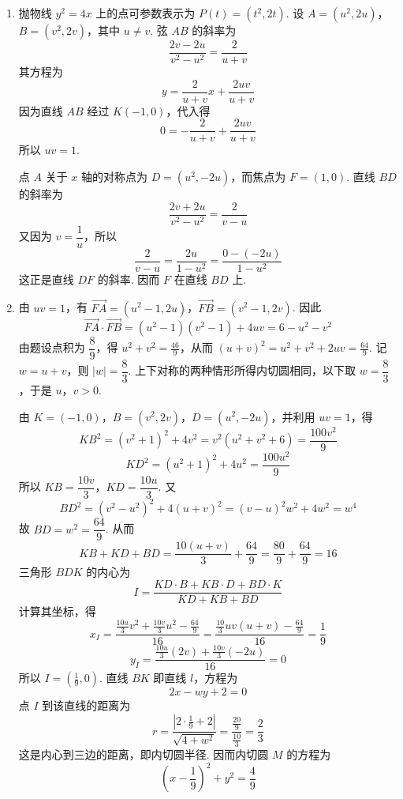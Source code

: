 \begin{solution}
\begin{enumerate}
\item 抛物线 \(y^2=4x\) 上的点可参数表示为 \(P(t)=(t^2,2t)\). 设
\(A=(u^2,2u)\)，\(B=(v^2,2v)\)，其中 \(u\ne v\). 弦 \(AB\) 的斜率为
\[
\frac{2v-2u}{v^2-u^2}=\frac{2}{u+v}
\]
其方程为
\[
y=\frac{2}{u+v}x+\frac{2uv}{u+v}
\]
因为直线 \(AB\) 经过 \(K(-1,0)\)，代入得
\[
0=-\frac{2}{u+v}+\frac{2uv}{u+v}
\]
所以 \(uv=1\).

点 \(A\) 关于 \(x\) 轴的对称点为 \(D=(u^2,-2u)\)，而焦点为 \(F=(1,0)\). 直线 \(BD\) 的斜率为
\[
\frac{2v+2u}{v^2-u^2}=\frac{2}{v-u}
\]
又因为 \(v=\dfrac1u\)，所以
\[
\frac{2}{v-u}=\frac{2u}{1-u^2}
=\frac{0-(-2u)}{1-u^2}
\]
这正是直线 \(DF\) 的斜率. 因而 \(F\) 在直线 \(BD\) 上.
\item 由 \(uv=1\)，有
\(\overrightarrow{FA}=(u^2-1,2u)\)，\(\overrightarrow{FB}=(v^2-1,2v)\).
因此
\[
\overrightarrow{FA}\cdot\overrightarrow{FB}
=(u^2-1)(v^2-1)+4uv
=6-u^2-v^2
\]
由题设点积为 \(\dfrac89\)，得 \(u^2+v^2=\frac{46}{9}\)，从而 \((u+v)^2=u^2+v^2+2uv=\frac{64}{9}\).
记 \(w=u+v\)，则 \(|w|=\dfrac83\). 上下对称的两种情形所得内切圆相同，以下取 \(w=\dfrac83\)，于是 \(u\)，\(v>0\).

由 \(K=(-1,0)\)，\(B=(v^2,2v)\)，\(D=(u^2,-2u)\)，并利用 \(uv=1\)，得
\[
KB^2=(v^2+1)^2+4v^2
=v^2\left(u^2+v^2+6\right)
=\frac{100v^2}{9}
\]
\[
KD^2=(u^2+1)^2+4u^2=\frac{100u^2}{9}
\]
所以 \(KB=\dfrac{10v}{3}\)，\(KD=\dfrac{10u}{3}\). 又
\[
BD^2=(v^2-u^2)^2+4(u+v)^2
=(v-u)^2w^2+4w^2=w^4
\]
故 \(BD=w^2=\dfrac{64}{9}\). 从而
\[
KB+KD+BD=\frac{10(u+v)}3+\frac{64}{9}
=\frac{80}{9}+\frac{64}{9}=16
\]
三角形 \(BDK\) 的内心为
\[
I=\frac{KD\cdot B+KB\cdot D+BD\cdot K}{KD+KB+BD}
\]
计算其坐标，得
\[
x_I=\frac{\frac{10u}{3}v^2+\frac{10v}{3}u^2-\frac{64}{9}}{16}
=\frac{\frac{10}{3}uv(u+v)-\frac{64}{9}}{16}
=\frac19
\]
\[
y_I=\frac{\frac{10u}{3}(2v)+\frac{10v}{3}(-2u)}{16}=0
\]
所以 \(I=(\frac19,0)\). 直线 \(BK\) 即直线 \(l\)，方程为
\[
2x-wy+2=0
\]
点 \(I\) 到该直线的距离为
\[
r=\frac{\left|2\cdot\frac19+2\right|}{\sqrt{4+w^2}}
=\frac{\frac{20}{9}}{\frac{10}{3}}=\frac23
\]
这是内心到三边的距离，即内切圆半径. 因而内切圆 \(M\) 的方程为
\[
\left(x-\frac19\right)^2+y^2=\frac49
\]
\end{enumerate}
\end{solution}
